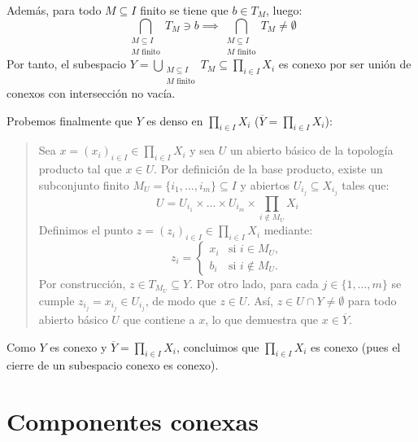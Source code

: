 \begin{dem}
    Además, para todo $M \subseteq I$ finito se tiene que $b \in T_M$, luego:
    \[
        \bigcap_{\substack{M \subseteq I \\ M \text{ finito}}} T_M \ni b \implies \bigcap_{\substack{M \subseteq I \\ M \text{ finito}}} T_M \neq \emptyset \text{}
    \]
    Por tanto, el subespacio $ \displaystyle Y = \bigcup_{\substack{M \subseteq I \\ M \text{ finito}}} T_M \subseteq \prod_{i \in I} X_i$ es conexo por ser unión de conexos con intersección no vacía.

    Probemos finalmente que $Y$ es denso en $\prod_{i \in I} X_i$ ($\overline{Y} = \prod_{i \in I} X_i$):
    \begin{quote}
        Sea $x = (x_i)_{i \in I} \in \prod_{i \in I} X_i$ y sea $U$ un abierto básico de la topología producto tal que $x \in U$. Por definición de la base producto, existe un subconjunto finito $M_U = \{i_1, \dots, i_m\} \subseteq I$ y abiertos $U_{i_j} \subseteq X_{i_j}$ tales que:
        \[
            \displaystyle U = U_{i_1} \times \dots \times U_{i_m} \times \prod_{i \notin M_U} X_i \text{}
        \]
        Definimos el punto $z = (z_i)_{i \in I} \in \prod_{i \in I} X_i$ mediante:
        \[
            z_i = \begin{cases} x_i & \text{si } i \in M_U, \\ b_i & \text{si } i \notin M_U. \end{cases} \text{}
        \]
        Por construcción, $z \in T_{M_U} \subseteq Y$. Por otro lado, para cada $j \in \{1, \dots, m\}$ se cumple $z_{i_j} = x_{i_j} \in U_{i_j}$, de modo que $z \in U$. Así, $z \in U \cap Y \neq \emptyset$ para todo abierto básico $U$ que contiene a $x$, lo que demuestra que $x \in \overline{Y}$.
    \end{quote}
    Como $Y$ es conexo y $\overline{Y} = \prod_{i \in I} X_i$, concluimos que $\prod_{i \in I} X_i$ es conexo (pues el cierre de un subespacio conexo es conexo).
\end{dem}



\section{Componentes conexas}


